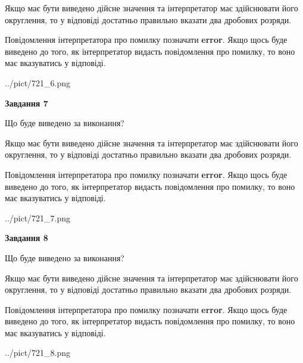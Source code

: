 \documentclass[12pt, ukrainian]{article}
\begin{document}
{\begin {Large}
Якщо має бути виведено дійсне значення та інтерпретатор має здійснювати його округлення, 
то у відповіді достатньо правильно вказати два дробових розряди.

Повідомлення інтерпретатора про помилку позначати \textbf{error}.
Якщо щось буде виведено до того, як інтерпретатор видасть повідомлення про помилку, 
то воно має вказуватись у відповіді. \par

\begin{center}
	{../pict/721_6.png}
\end{center}
\newpage

{\begin {center}\textbf{Завдання 7}\end {center}}\par
Що буде виведено за виконання? \par

Якщо має бути виведено дійсне значення та інтерпретатор має здійснювати його округлення, 
то у відповіді достатньо правильно вказати два дробових розряди.

Повідомлення інтерпретатора про помилку позначати \textbf{error}.
Якщо щось буде виведено до того, як інтерпретатор видасть повідомлення про помилку, 
то воно має вказуватись у відповіді. \par

\begin{center}
	{../pict/721_7.png}
\end{center}
\newpage

{\begin {center}\textbf{Завдання 8}\end {center}}\par
Що буде виведено за виконання? \par

Якщо має бути виведено дійсне значення та інтерпретатор має здійснювати його округлення, 
то у відповіді достатньо правильно вказати два дробових розряди.

Повідомлення інтерпретатора про помилку позначати \textbf{error}.
Якщо щось буде виведено до того, як інтерпретатор видасть повідомлення про помилку, 
то воно має вказуватись у відповіді. \par

\begin{center}
	{../pict/721_8.png}
\end{center}
\newpage


\end{Large}}
\end{document}
